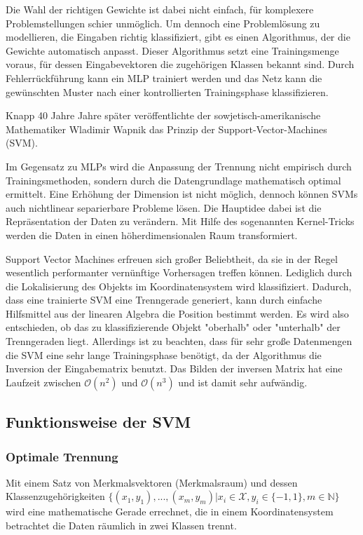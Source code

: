 Die Wahl der richtigen Gewichte ist dabei nicht einfach, für komplexere Problemstellungen schier unmöglich. 
Um dennoch eine Problemlösung zu modellieren, die Eingaben richtig klassifiziert, gibt es einen Algorithmus, der die Gewichte automatisch anpasst.
Dieser Algorithmus setzt eine Trainingsmenge voraus, für dessen Eingabevektoren die zugehörigen Klassen bekannt sind. 
Durch Fehlerrückführung kann ein MLP trainiert werden und das Netz kann die gewünschten Muster nach einer kontrollierten Trainingsphase klassifizieren.

Knapp 40 Jahre Jahre später veröffentlichte der sowjetisch-amerikanische Mathematiker Wladimir Wapnik \cite{Vapnik} das Prinzip der Support-Vector-Machines (\ac{SVM}).

Im Gegensatz zu \ac{MLP}s wird die Anpassung der Trennung nicht empirisch durch Trainingsmethoden, sondern durch die Datengrundlage mathematisch optimal ermittelt. 
Eine Erhöhung der Dimension ist nicht möglich, dennoch können SVMs auch nichtlinear separierbare Probleme lösen. 
Die Hauptidee dabei ist die Repräsentation der Daten zu verändern. 
Mit Hilfe des sogenannten Kernel-Tricks werden die Daten in einen höherdimensionalen Raum transformiert. 

Support Vector Machines erfreuen sich großer Beliebtheit, da sie in der Regel wesentlich performanter vernünftige Vorhersagen treffen können. Lediglich durch die Lokalisierung des Objekts im Koordinatensystem wird klassifiziert. Dadurch, dass eine trainierte SVM eine Trenngerade generiert, kann durch einfache Hilfsmittel aus der linearen Algebra die Position bestimmt werden. Es wird also entschieden, ob das zu klassifizierende Objekt "{}oberhalb"{} oder "{}unterhalb"{} der Trenngeraden liegt. Allerdings ist zu beachten, dass für sehr große Datenmengen die \ac{SVM} eine sehr lange Trainingsphase benötigt, da der Algorithmus die Inversion der Eingabematrix benutzt. Das Bilden der inversen Matrix hat eine Laufzeit zwischen $\mathcal O(n^2)$ und $\mathcal O(n^3)$ und ist damit sehr aufwändig.


\subsection{Funktionsweise der SVM}

\subsubsection{Optimale Trennung}
Mit einem Satz von Merkmalsvektoren (Merkmalsraum) und dessen Klassenzugehörigkeiten $\{ (x_1, y_1), ..., (x_m, y_m) | x_i \in \mathcal{X}, y_i \in \{-1, 1\}, m \in \mathbb{N} \}$ wird eine mathematische Gerade errechnet,
die in einem Koordinatensystem betrachtet die Daten räumlich in zwei Klassen trennt. 



